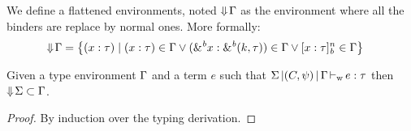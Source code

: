 We define a flattened environments, noted $\Downarrow\!\Gamma$ as the environment
where all the binders are replace by normal ones. More formally:
\begin{align*}
  \Downarrow\!\Gamma
  &= \left\{ (x : \tau) \mid
    (x : \tau)\in\Gamma
    \vee ({\&}^{\textit{b}}x : {\&}^{\textit{b}}(k,\tau))\in\Gamma
    \vee [x : \tau]_{\textit{b}}^n\in\Gamma
    \right\}
\end{align*}

\begin{lemma}
  \label{lemma:env:flat}
  Given a type environment $\Gamma$ and a term $e$ such
  that $\Sigma \operatorname{|} (C,\mathrm{\psi}) \operatorname{|} \Gamma \operatorname{\vdash_w} e : \tau$ 
  then $\Downarrow\!\Sigma \subset \Gamma$.
  \begin{proof}
    By induction over the typing derivation.
  \end{proof}
\end{lemma}




